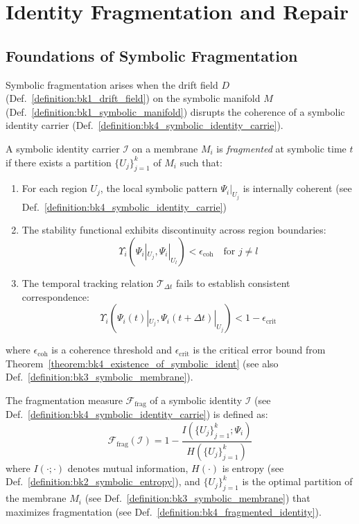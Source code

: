\section{Identity Fragmentation and Repair} \label{sec:bk4_identity_fragmentation_repair}
\subsection{Foundations of Symbolic Fragmentation} \label{subsec:bk4_foundations_symbolic_fragmentation}
Symbolic fragmentation arises when the drift field $D$ (Def.~\ref{definition:bk1_drift_field}) on the symbolic manifold $M$ (Def.~\ref{definition:bk1_symbolic_manifold}) disrupts the coherence of a symbolic identity carrier (Def.~\ref{definition:bk4_symbolic_identity_carrie}).
\begin{definition} \label{definition:bk4_fragmented_identity}
A symbolic identity carrier $\mathcal{I}$ on a membrane $M_i$ is \textit{fragmented} at symbolic time $t$ if there exists a partition $\{U_j\}_{j=1}^k$ of $M_i$ such that:
\begin{enumerate}
    \item For each region $U_j$, the local symbolic pattern $\Psi_i|_{U_j}$ is internally coherent (see Def.~\ref{definition:bk4_symbolic_identity_carrie})
    \item The stability functional exhibits discontinuity across region boundaries:
    \begin{equation}
        \Upsilon_i(\Psi_i|_{U_j}, \Psi_i|_{U_l}) < \epsilon_{\text{coh}} \quad \text{for } j \neq l
    \end{equation}
    \item The temporal tracking relation $\mathcal{T}_{\Delta t}$ fails to establish consistent correspondence:
    \begin{equation}
        \Upsilon_i(\Psi_i(t)|_{U_j}, \Psi_i(t+\Delta t)|_{U_j}) < 1 - \epsilon_{\text{crit}}
    \end{equation}
\end{enumerate}
where $\epsilon_{\text{coh}}$ is a coherence threshold and $\epsilon_{\text{crit}}$ is the critical error bound from Theorem~\ref{theorem:bk4_existence_of_symbolic_ident} (see also Def.~\ref{definition:bk3_symbolic_membrane}).
\end{definition}
\begin{definition} \label{definition:bk4_fragmentation_measure}
The fragmentation measure $\mathcal{F}_{\text{frag}}$ of a symbolic identity $\mathcal{I}$ (see Def.~\ref{definition:bk4_symbolic_identity_carrie}) is defined as:
\begin{equation}
    \mathcal{F}_{\text{frag}}(\mathcal{I}) = 1 - \frac{I(\{U_j\}_{j=1}^k; \Psi_i)}{H(\{U_j\}_{j=1}^k)}
\end{equation}
where $I(\cdot;\cdot)$ denotes mutual information, $H(\cdot)$ is entropy (see Def.~\ref{definition:bk2_symbolic_entropy}), and $\{U_j\}_{j=1}^k$ is the optimal partition of the membrane $M_i$ (see Def.~\ref{definition:bk3_symbolic_membrane}) that maximizes fragmentation (see Def.~\ref{definition:bk4_fragmented_identity}).
\end{definition}
